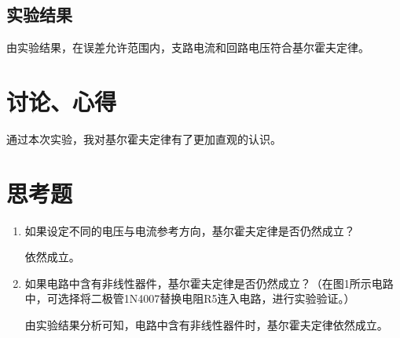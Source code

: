\documentclass{../source/Experiment}
\begin{document}
        \subsection{实验结果}
            由实验结果，在误差允许范围内，支路电流和回路电压符合基尔霍夫定律。
    \section{讨论、心得}
            通过本次实验，我对基尔霍夫定律有了更加直观的认识。
    \section{思考题}
            \begin{enumerate}
                \item 如果设定不同的电压与电流参考方向，基尔霍夫定律是否仍然成立？
                \par 依然成立。
                \item 如果电路中含有非线性器件，基尔霍夫定律是否仍然成立？（在图1所示电路中，可选择将二极管1N4007替换电阻R5连入电路，进行实验验证。） 
                \par 由实验结果分析可知，电路中含有非线性器件时，基尔霍夫定律依然成立。
            \end{enumerate}
\end{document}
